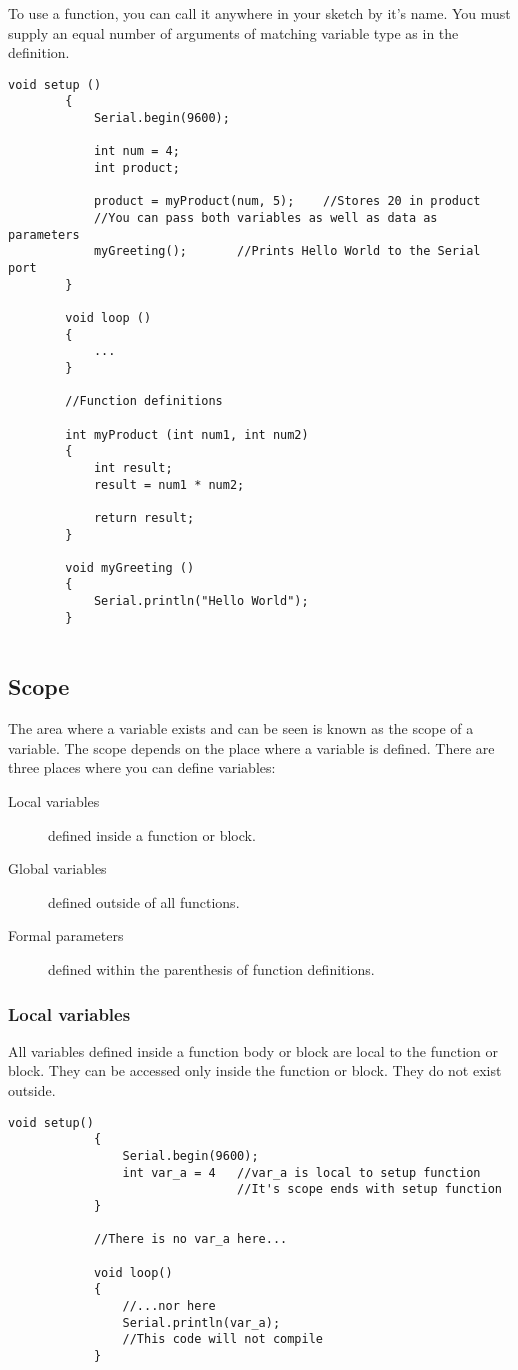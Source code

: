 \documentclass{article}
\begin{document}
		To use a function, you can call it anywhere in your sketch by it's name. You must supply an equal number of arguments of matching variable type as in the definition.

		\begin{lstlisting}[gobble=8]
		void setup ()
		{
			Serial.begin(9600);

			int num = 4;
			int product;

			product = myProduct(num, 5);	//Stores 20 in product
			//You can pass both variables as well as data as parameters
			myGreeting();		//Prints Hello World to the Serial port
		}

		void loop ()
		{
			...
		}

		//Function definitions

		int myProduct (int num1, int num2)
		{
			int result;
			result = num1 * num2;

			return result;
		}

		void myGreeting ()
		{
			Serial.println("Hello World");
		}
		
		\end{lstlisting}

	\subsection{Scope}

			The area where a variable exists and can be seen is known as the scope of a variable. The scope depends on the place where a variable is defined. There are three places where you can define variables:

			\begin{description}
			\item[Local variables] defined inside a function or block.
			\item[Global variables] defined outside of all functions.
			\item[Formal parameters] defined within the parenthesis of function definitions.
			\end{description}

		\subsubsection{Local variables}

			All variables defined inside a function body or block are local to the function or block. They can be accessed only inside the function or block. They do not exist outside.

			\begin{lstlisting}[gobble=12]
			void setup()
			{
				Serial.begin(9600);
				int var_a = 4	//var_a is local to setup function
								//It's scope ends with setup function
			}

			//There is no var_a here...

			void loop()
			{
				//...nor here
				Serial.println(var_a);
				//This code will not compile
			}
			\end{lstlisting}
\end{document}
